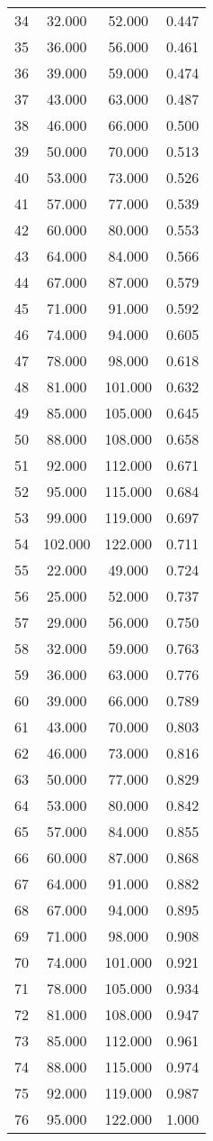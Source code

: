 \begin{tabular}{cccc}
  34 & 32.000 & 52.000 & 0.447 \\ 
  35 & 36.000 & 56.000 & 0.461 \\ 
  36 & 39.000 & 59.000 & 0.474 \\ 
  37 & 43.000 & 63.000 & 0.487 \\ 
  38 & 46.000 & 66.000 & 0.500 \\ 
  39 & 50.000 & 70.000 & 0.513 \\ 
  40 & 53.000 & 73.000 & 0.526 \\ 
  41 & 57.000 & 77.000 & 0.539 \\ 
  42 & 60.000 & 80.000 & 0.553 \\ 
  43 & 64.000 & 84.000 & 0.566 \\ 
  44 & 67.000 & 87.000 & 0.579 \\ 
  45 & 71.000 & 91.000 & 0.592 \\ 
  46 & 74.000 & 94.000 & 0.605 \\ 
  47 & 78.000 & 98.000 & 0.618 \\ 
  48 & 81.000 & 101.000 & 0.632 \\ 
  49 & 85.000 & 105.000 & 0.645 \\ 
  50 & 88.000 & 108.000 & 0.658 \\ 
  51 & 92.000 & 112.000 & 0.671 \\ 
  52 & 95.000 & 115.000 & 0.684 \\ 
  53 & 99.000 & 119.000 & 0.697 \\ 
  54 & 102.000 & 122.000 & 0.711 \\ 
  55 & 22.000 & 49.000 & 0.724 \\ 
  56 & 25.000 & 52.000 & 0.737 \\ 
  57 & 29.000 & 56.000 & 0.750 \\ 
  58 & 32.000 & 59.000 & 0.763 \\ 
  59 & 36.000 & 63.000 & 0.776 \\ 
  60 & 39.000 & 66.000 & 0.789 \\ 
  61 & 43.000 & 70.000 & 0.803 \\ 
  62 & 46.000 & 73.000 & 0.816 \\ 
  63 & 50.000 & 77.000 & 0.829 \\ 
  64 & 53.000 & 80.000 & 0.842 \\ 
  65 & 57.000 & 84.000 & 0.855 \\ 
  66 & 60.000 & 87.000 & 0.868 \\ 
  67 & 64.000 & 91.000 & 0.882 \\ 
  68 & 67.000 & 94.000 & 0.895 \\ 
  69 & 71.000 & 98.000 & 0.908 \\ 
  70 & 74.000 & 101.000 & 0.921 \\ 
  71 & 78.000 & 105.000 & 0.934 \\ 
  72 & 81.000 & 108.000 & 0.947 \\ 
  73 & 85.000 & 112.000 & 0.961 \\ 
  74 & 88.000 & 115.000 & 0.974 \\ 
  75 & 92.000 & 119.000 & 0.987 \\ 
  76 & 95.000 & 122.000 & 1.000 \\ 
   \hline
\end{tabular}
